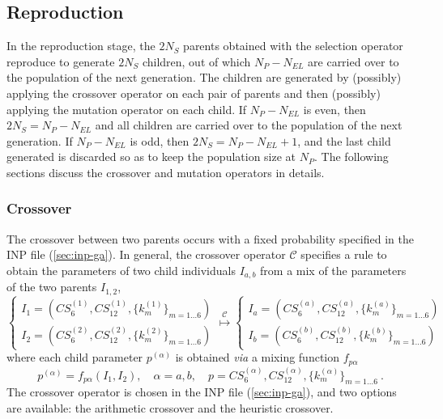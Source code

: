 \documentclass[10pt,a4paper,openany]{memoir}
\numberwithin{equation}{section}
\begin{document}
\subsection{Reproduction}
\label{sec:ga-reproduction}

In the reproduction stage, the $2N_S$ parents obtained with the
selection operator reproduce to generate $2N_S$ children, out of which
$N_P-N_{EL}$ are carried over to the population of the next
generation. The children are generated by (possibly) applying the
crossover operator on each pair of parents and then (possibly)
applying the mutation operator on each child. If $N_P-N_{EL}$ is even,
then $2N_S=N_P-N_{EL}$ and all children are carried over to the
population of the next generation. If $N_P - N_{EL}$ is odd, then
$2N_S=N_P-N_{EL}+1$, and the last child generated is discarded so as
to keep the population size at $N_P$.  The following sections discuss
the crossover and mutation operators in details.

\subsubsection{Crossover}
\label{sec:ga-crossover}

The crossover between two parents occurs with a fixed probability
specified in the INP file (\autoref{sec:inp-ga}). In general, the
crossover operator $\mathcal{C}$ specifies a rule to obtain the
parameters of two child individuals $I_{a,b}$ from a mix of the
parameters of the two parents $I_{1,2}$,
\begin{equation}
  \label{eq:ga-crossover}
  \left\{
    \begin{array}{l}
      I_1 = (CS_6^{(1)},CS_{12}^{(1)},\{k_m^{(1)}\}_{m=1\ldots 6}) \\
      I_2 = (CS_6^{(2)},CS_{12}^{(2)},\{k_m^{(2)}\}_{m=1\ldots 6})
    \end{array}
  \right.
  \overset{\mathcal{C}}{\longmapsto}
    \left\{
    \begin{array}{l}
      I_a = (CS_6^{(a)},CS_{12}^{(a)},\{k_m^{(a)}\}_{m=1\ldots 6}) \\
      I_b = (CS_6^{(b)},CS_{12}^{(b)},\{k_m^{(b)}\}_{m=1\ldots 6})
    \end{array}
  \right.
\end{equation}
where each child parameter $p^{(\alpha)}$ is obtained \textit{via} a mixing function $f_{p\alpha}$
\begin{equation*}
  p^{(\alpha)} = f_{p\alpha}(I_1,I_2),\quad \alpha=a,b, \quad p = CS_6^{(\alpha)},CS_{12}^{(\alpha)},\{k_m^{(\alpha)}\}_{m=1\ldots 6}\ .
\end{equation*}
The crossover operator is chosen in the INP file
(\autoref{sec:inp-ga}), and two options are available: the arithmetic
crossover and the heuristic crossover.
\end{document}
